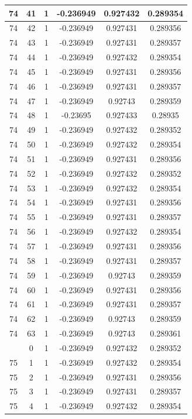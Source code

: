 \documentclass[12pt,a4paper]{article}
\numberwithin{equation}{section}
\numberwithin{figure}{section}
\numberwithin{table}{section}
\begin{document}
\begin{longtable}{|c|c|c|c|c|c|}
74 & 41 & 1 & -0.236949 & 0.927432 & 0.289354 \\ \hline
74 & 42 & 1 & -0.236949 & 0.927431 & 0.289356 \\ \hline
74 & 43 & 1 & -0.236949 & 0.927431 & 0.289357 \\ \hline
74 & 44 & 1 & -0.236949 & 0.927432 & 0.289354 \\ \hline
74 & 45 & 1 & -0.236949 & 0.927431 & 0.289356 \\ \hline
74 & 46 & 1 & -0.236949 & 0.927431 & 0.289357 \\ \hline
74 & 47 & 1 & -0.236949 & 0.92743 & 0.289359 \\ \hline
74 & 48 & 1 & -0.23695 & 0.927433 & 0.28935 \\ \hline
74 & 49 & 1 & -0.236949 & 0.927432 & 0.289352 \\ \hline
74 & 50 & 1 & -0.236949 & 0.927432 & 0.289354 \\ \hline
74 & 51 & 1 & -0.236949 & 0.927431 & 0.289356 \\ \hline
74 & 52 & 1 & -0.236949 & 0.927432 & 0.289352 \\ \hline
74 & 53 & 1 & -0.236949 & 0.927432 & 0.289354 \\ \hline
74 & 54 & 1 & -0.236949 & 0.927431 & 0.289356 \\ \hline
74 & 55 & 1 & -0.236949 & 0.927431 & 0.289357 \\ \hline
74 & 56 & 1 & -0.236949 & 0.927432 & 0.289354 \\ \hline
74 & 57 & 1 & -0.236949 & 0.927431 & 0.289356 \\ \hline
74 & 58 & 1 & -0.236949 & 0.927431 & 0.289357 \\ \hline
74 & 59 & 1 & -0.236949 & 0.92743 & 0.289359 \\ \hline
74 & 60 & 1 & -0.236949 & 0.927431 & 0.289356 \\ \hline
74 & 61 & 1 & -0.236949 & 0.927431 & 0.289357 \\ \hline
74 & 62 & 1 & -0.236949 & 0.92743 & 0.289359 \\ \hline
74 & 63 & 1 & -0.236949 & 0.92743 & 0.289361 \\ \hline
\pagebreak
75 & 0 & 1 & -0.236949 & 0.927432 & 0.289352 \\ \hline
75 & 1 & 1 & -0.236949 & 0.927432 & 0.289354 \\ \hline
75 & 2 & 1 & -0.236949 & 0.927431 & 0.289356 \\ \hline
75 & 3 & 1 & -0.236949 & 0.927431 & 0.289357 \\ \hline
75 & 4 & 1 & -0.236949 & 0.927432 & 0.289354 \\ \hline

\end{longtable}
\end{document}
